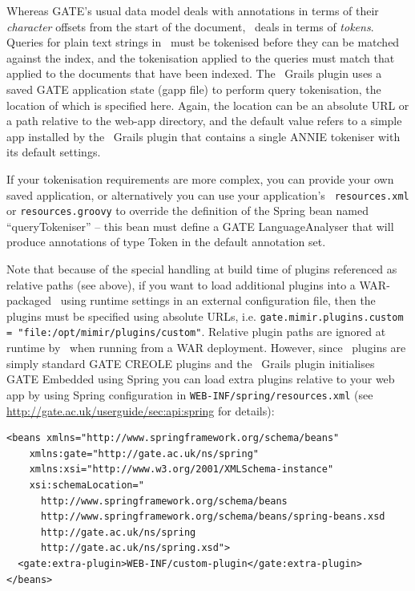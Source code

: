 Whereas GATE's usual data model deals with annotations in terms of their {\em
character} offsets from the start of the document, \Mimir\ deals in terms of
{\em tokens}.  Queries for plain text strings in \Mimir\ must be tokenised
before they can be matched against the index, and the tokenisation applied to
the queries must match that applied to the documents that have been indexed.
The \Mimir\ Grails plugin uses a saved GATE application state (gapp file) to
perform query tokenisation, the location of which is specified here.  Again,
the location can be an absolute URL or a path relative to the web-app
directory, and the default value refers to a simple app installed by the
\Mimir\ Grails plugin that contains a single ANNIE tokeniser with its default
settings.

If your tokenisation requirements are more complex, you can provide your own
saved application, or alternatively you can use your application's {\tt
resources.xml} or {\tt resources.groovy} to override the definition of the
Spring bean named ``queryTokeniser'' -- this bean must define a GATE
LanguageAnalyser that will produce annotations of type Token in the default
annotation set.

Note that because of the special handling at build time of plugins referenced
as relative paths (see above), if you want to load additional plugins into a
WAR-packaged \Mimir\ using runtime settings in an external configuration file,
then the plugins must be specified using absolute URLs, i.e.
{\tt gate.mimir.plugins.custom = "file:/opt/mimir/plugins/custom"}.  Relative
plugin paths are ignored at runtime by \Mimir\ when running from a WAR
deployment.  However, since \Mimir\ plugins are simply standard GATE CREOLE
plugins and the \Mimir\ Grails plugin initialises GATE Embedded using Spring
you can load extra plugins relative to your web app by using Spring
configuration in {\tt WEB-INF/spring/resources.xml} (see
\url{http://gate.ac.uk/userguide/sec:api:spring} for details):

\begin{lstlisting}
<beans xmlns="http://www.springframework.org/schema/beans"
    xmlns:gate="http://gate.ac.uk/ns/spring"
    xmlns:xsi="http://www.w3.org/2001/XMLSchema-instance"
    xsi:schemaLocation="
      http://www.springframework.org/schema/beans
      http://www.springframework.org/schema/beans/spring-beans.xsd
      http://gate.ac.uk/ns/spring
      http://gate.ac.uk/ns/spring.xsd">
  <gate:extra-plugin>WEB-INF/custom-plugin</gate:extra-plugin>
</beans>
\end{lstlisting}

